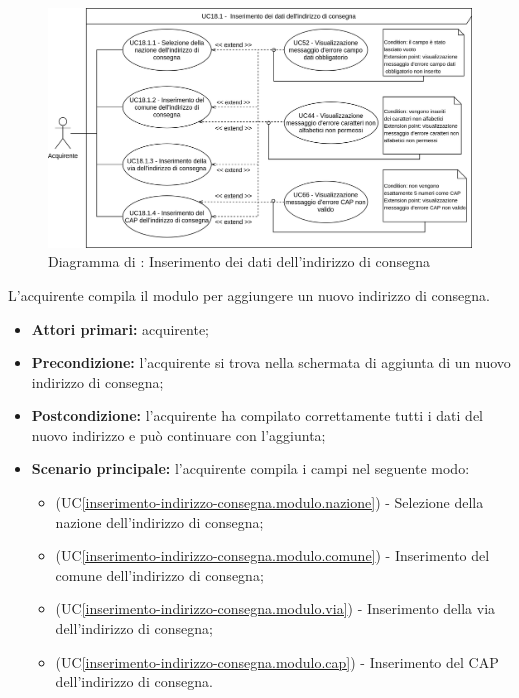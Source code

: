\label{inserimento-indirizzo-consegna.modulo}

\begin{figure}[H]
    \centering
    \includegraphics[scale=0.6]{Immagini/DiagrammiUC/Acquirente/InserimentoDatiIndirizzoConsegna.png}
    \caption{Diagramma di \actualSubUC: Inserimento dei dati dell'indirizzo di consegna} 
    \label{fig:inserimento-indirizzo-consegna.modulo}
\end{figure}

L'acquirente compila il modulo per aggiungere un nuovo indirizzo di consegna.
\begin{itemize}
	\item \textbf{Attori primari:} acquirente;
	\item \textbf{Precondizione:} l'acquirente si trova nella schermata di aggiunta di un nuovo indirizzo di consegna;
	\item \textbf{Postcondizione:} l'acquirente ha compilato correttamente tutti i dati del nuovo indirizzo e può continuare con l'aggiunta;
	\item \textbf{Scenario principale:} l'acquirente compila i campi nel seguente modo:
	\begin{itemize}
		\item (UC\ref{inserimento-indirizzo-consegna.modulo.nazione}) - Selezione della nazione dell'indirizzo di consegna;
		\item (UC\ref{inserimento-indirizzo-consegna.modulo.comune}) - Inserimento del comune dell'indirizzo di consegna;
		\item (UC\ref{inserimento-indirizzo-consegna.modulo.via}) - Inserimento della via dell'indirizzo di consegna;
		\item (UC\ref{inserimento-indirizzo-consegna.modulo.cap}) - Inserimento del CAP dell'indirizzo di consegna.
	\end{itemize}
\end{itemize}

